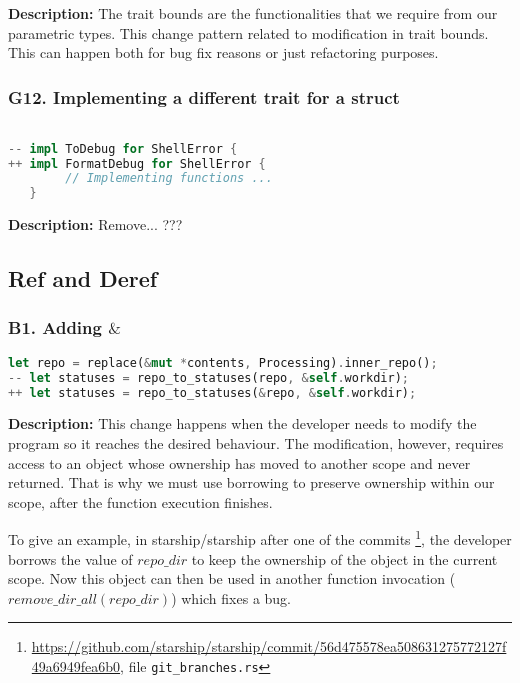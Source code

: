 \noindent \textbf{Description:} The trait bounds are the functionalities that we require from our parametric types. This change pattern related to modification in trait bounds. This can happen both for bug fix reasons or just refactoring purposes.

\subsubsection{G12. Implementing a different trait for a struct}

\begin{lstlisting}[language=Rust, style=colouredRust, label={l3}]

-- impl ToDebug for ShellError {
++ impl FormatDebug for ShellError {
        // Implementing functions ...
   }

\end{lstlisting}

\noindent \textbf{Description:} Remove... ???

\subsection{Ref and Deref}
\subsubsection{B1. Adding $\&$}

\begin{lstlisting}[language=Rust, style=colouredRust, label={l3}]
let repo = replace(&mut *contents, Processing).inner_repo();
-- let statuses = repo_to_statuses(repo, &self.workdir);
++ let statuses = repo_to_statuses(&repo, &self.workdir);
\end{lstlisting}

\noindent \textbf{Description:} This change happens when the developer needs to modify the program so it reaches the desired behaviour. The modification, however, requires access to an object whose ownership has moved to another scope and never returned. That is why we must use borrowing to preserve ownership within our scope, after the function execution finishes.

To give an example, in starship/starship after one of the commits \footnote{\url{https://github.com/starship/starship/commit/56d475578ea508631275772127f49a6949fea6b0}, file \texttt{git\_branches.rs}}, the developer borrows the value of $repo\_dir$ to keep the ownership of the object in the current scope. Now this object can then be used in another function invocation ($remove\_dir\_all(repo\_dir)$) which fixes a bug.

